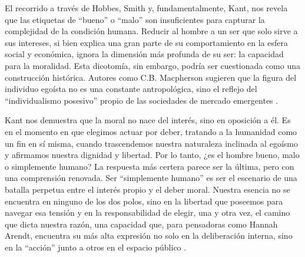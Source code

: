 \documentclass[12pt, a4paper]{article}
\begin{document}
El recorrido a través de Hobbes, Smith y, fundamentalmente, Kant, nos revela que las etiquetas de ``bueno'' o ``malo'' son insuficientes para capturar la complejidad de la condición humana. Reducir al hombre a un ser que solo sirve a sus intereses, si bien explica una gran parte de su comportamiento en la esfera social y económica, ignora la dimensión más profunda de su ser: la capacidad para la moralidad. Esta dicotomía, sin embargo, podría ser cuestionada como una construcción histórica. Autores como C.B. Macpherson sugieren que la figura del individuo egoísta no es una constante antropológica, sino el reflejo del ``individualismo posesivo'' propio de las sociedades de mercado emergentes \autocite{Macpherson1962}.

Kant nos demuestra que la moral no nace del interés, sino en oposición a él. Es en el momento en que elegimos actuar por deber, tratando a la humanidad como un fin en sí misma, cuando trascendemos nuestra naturaleza inclinada al egoísmo y afirmamos nuestra dignidad y libertad. Por lo tanto, ¿es el hombre bueno, malo o simplemente humano? La respuesta más certera parece ser la última, pero con una comprensión renovada. Ser ``simplemente humano'' es ser el escenario de una batalla perpetua entre el interés propio y el deber moral. Nuestra esencia no se encuentra en ninguno de los dos polos, sino en la libertad que poseemos para navegar esa tensión y en la responsabilidad de elegir, una y otra vez, el camino que dicta nuestra razón, una capacidad que, para pensadoras como Hannah Arendt, encuentra su más alta expresión no solo en la deliberación interna, sino en la ``acción'' junto a otros en el espacio público \autocite{Arendt1958}.

\newpage
\printbibliography
\end{document}
